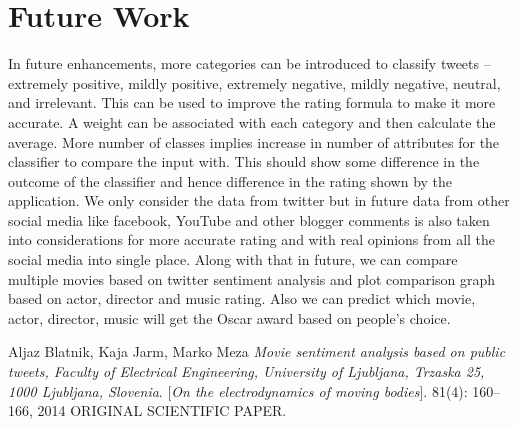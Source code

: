 \documentclass[a4paper]{article}
\begin{document}
\section{Future Work}
In future enhancements, more categories can be introduced to classify tweets – extremely positive, mildly positive, extremely negative, mildly negative, neutral, and irrelevant. This can be used to improve the rating formula to make it more accurate. A weight can be associated with each category and then calculate the average.
More number of classes implies increase in number of attributes for the classifier to compare the input with. This should show some difference in the outcome of the classifier and hence difference in the rating shown by the application. We only consider the data from twitter but in future data from other social media like facebook, YouTube and other blogger comments is also taken into considerations for more accurate rating and with real opinions from all the social media into single place.
Along with that in future, we can compare multiple movies based on twitter sentiment analysis and plot comparison graph based on actor, director and music rating. Also we can predict which movie, actor, director, music will get the Oscar award based on people’s choice.
\begin{thebibliography}{9}
Aljaz Blatnik, Kaja Jarm, Marko Meza 
\textit{ Movie sentiment
analysis based on public tweets, Faculty of Electrical
Engineering, University of Ljubljana, Trzaska 25, 1000
Ljubljana, Slovenia}.
[\textit{On the electrodynamics of moving bodies}]. 
 81(4): 160–166, 2014 ORIGINAL
SCIENTIFIC PAPER.


\end{thebibliography}
\end{document}
